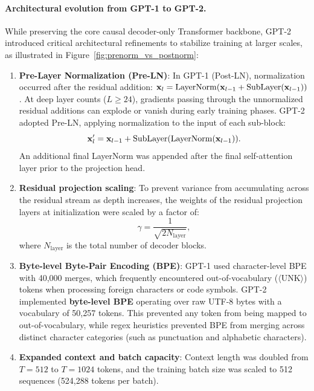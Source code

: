 \documentclass[../../main.tex]{subfiles}
\begin{document}
\paragraph{Architectural evolution from GPT-1 to GPT-2.}
While preserving the core causal decoder-only Transformer backbone, GPT-2 introduced critical architectural refinements to stabilize training at larger scales, as illustrated in Figure~\ref{fig:prenorm_vs_postnorm}:
\begin{enumerate}
    \item \textbf{Pre-Layer Normalization (Pre-LN)}: In GPT-1 (Post-LN), normalization occurred after the residual addition: $\mathbf{x}_{l} = \operatorname{\mathrm{LayerNorm}}(\mathbf{x}_{l-1} + \text{SubLayer}(\mathbf{x}_{l-1}))$. At deep layer counts ($L \ge 24$), gradients passing through the unnormalized residual additions can explode or vanish during early training phases. GPT-2 adopted Pre-LN, applying normalization to the input of each sub-block:
    \begin{equation}
    \label{eq:pre_layer_norm}
    \mathbf{x}'_{l} = \mathbf{x}_{l-1} + \text{SubLayer}(\operatorname{\mathrm{LayerNorm}}(\mathbf{x}_{l-1})).
    \end{equation}
    An additional final LayerNorm was appended after the final self-attention layer prior to the projection head.
    \item \textbf{Residual projection scaling}: To prevent variance from accumulating across the residual stream as depth increases, the weights of the residual projection layers at initialization were scaled by a factor of:
    \begin{equation}
    \label{eq:residual_scaling}
    \gamma = \frac{1}{\sqrt{2 N_{\text{layer}}}},
    \end{equation}
    where $N_{\text{layer}}$ is the total number of decoder blocks.
    \item \textbf{Byte-level Byte-Pair Encoding (BPE)}: GPT-1 used character-level BPE with 40,000 merges, which frequently encountered out-of-vocabulary ($\langle\text{UNK}\rangle$) tokens when processing foreign characters or code symbols. GPT-2 implemented \textbf{byte-level BPE} operating over raw UTF-8 bytes with a vocabulary of 50,257 tokens. This prevented any token from being mapped to out-of-vocabulary, while regex heuristics prevented BPE from merging across distinct character categories (such as punctuation and alphabetic characters).
    \item \textbf{Expanded context and batch capacity}: Context length was doubled from $T = 512$ to $T = 1024$ tokens, and the training batch size was scaled to 512 sequences (524,288 tokens per batch).
\end{enumerate}
\end{document}
